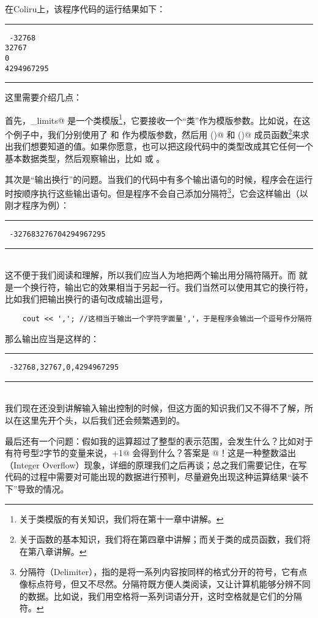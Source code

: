 在Coliru上，该程序代码的运行结果如下：\\\noindent\rule{\textwidth}{.2pt}\texttt{
-32768\\
32767\\
0\\
4294967295
}\\\noindent\rule{\textwidth}{.2pt}\par
这里需要介绍几点：\par
首先，\lstinline@numeric_limits@ 是一个类模版\footnote{关于类模版的有关知识，我们将在第十一章中讲解。}，它要接收一个``类''作为模版参数。比如说，在这个例子中，我们分别使用了 \lstinline@short@ 和 \lstinline@unsigned@ 作为模版参数，然后用 \lstinline@lowest()@ 和 \lstinline@max()@ 成员函数\footnote{关于函数的基本知识，我们将在第四章中讲解；而关于类的成员函数，我们将在第八章讲解。}来求出我们想要知道的值。如果你愿意，也可以把这段代码中的类型改成其它任何一个基本数据类型，然后观察输出，比如 \lstinline@double@ 或 \lstinline@char@。\par
其次是``输出换行''的问题。当我们的代码中有多个输出语句的时候，程序会在运行时按顺序执行这些输出语句。但是程序不会自己添加分隔符\footnote{分隔符（Delimiter），指的是将一系列内容按同样的格式分开的符号，它有点像标点符号，但又不尽然。分隔符既方便人类阅读，又让计算机能够分辨不同的数据。比如说，我们用空格将一系列词语分开，这时空格就是它们的分隔符。}，它会这样输出（以刚才程序为例）：\\\noindent\rule{\textwidth}{.2pt}\texttt{
-327683276704294967295
}\\\noindent\rule{\textwidth}{.2pt}\\
这不便于我们阅读和理解，所以我们应当人为地把两个输出用分隔符隔开。而 \lstinline@cout@ 就是一个换行符，输出它的效果相当于另起一行。我们当然可以使用其它的换行符，比如我们把输出换行的语句改成输出逗号，
\begin{lstlisting}
    cout << ','; //这相当于输出一个字符字面量','，于是程序会输出一个逗号作分隔符
\end{lstlisting}
那么输出应当是这样的：\\\noindent\rule{\textwidth}{.2pt}\texttt{
-32768,32767,0,4294967295
}\\\noindent\rule{\textwidth}{.2pt}\\
我们现在还没到讲解输入输出控制的时候，但这方面的知识我们又不得不了解，所以在这里先开个头，以后我们还会频繁遇到的。\par
最后还有一个问题：假如我的运算超过了整型的表示范围，会发生什么？比如对于有符号型2字节的变量来说，+1@ 会得到什么？答案是 @！这是一种整数溢出（Integer Overflow）现象，详细的原理我们之后再谈；总之我们需要记住，在写代码的过程中需要对可能出现的数据进行预判，尽量避免出现这种运算结果``装不下''导致的情况。\par
